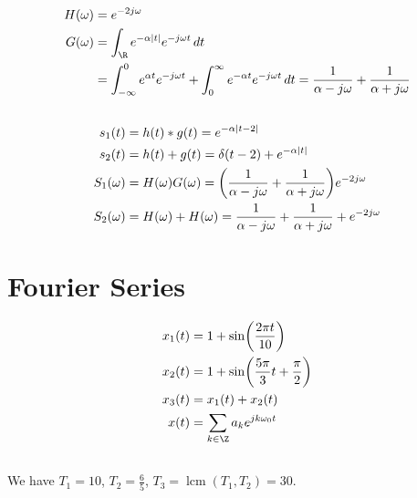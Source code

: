\documentclass{article}
\begin{document}
\subsection{}

\begin{align}
    H(\omega) &= e^{-2j \omega} \\
    G(\omega) &= \int_{\R} e^{-\alpha |t|} e^{-j \omega t} \, dt \\
    &= \int_{-\infty}^0 e^{\alpha t} e^{-j \omega t} + \int_0^\infty e^{-\alpha t} e^{-j \omega t} \, dt = \frac{1}{\alpha - j\omega} + \frac{1}{\alpha + j\omega}
\end{align}

\subsection{}

\begin{align}
    s_1(t) &= h(t) \ast g(t) = e^{-\alpha |t - 2|} \\
    s_2(t) &= h(t) + g(t) = \delta(t - 2) + e^{-\alpha |t|} \\
    S_1(\omega) &= H(\omega) G(\omega) = \qty(\frac{1}{\alpha - j \omega} + \frac{1}{\alpha + j \omega}) e^{-2j \omega} \\
    S_2(\omega) &= H(\omega) + H(\omega) = \frac{1}{\alpha - j \omega} + \frac{1}{\alpha + j \omega} + e^{-2j \omega}
\end{align}

\section{Fourier Series}

\begin{align}
    x_1(t) &= 1 + \sin(\frac{2 \pi t}{10}) \\
    x_2(t) &= 1 + \sin(\frac{5 \pi}{3} t + \frac{\pi}{2}) \\
    x_3(t) &= x_1(t) + x_2(t) \\
    x(t) &= \sum_{k \in \Z} a_k e^{j k \omega_0 t}
\end{align}

\subsection{}

We have \(T_1 = 10\), \(T_2 = \frac{6}{5}\), \(T_3 = \operatorname{lcm}(T_1, T_2) = 30\).

\subsection{}
\end{document}

